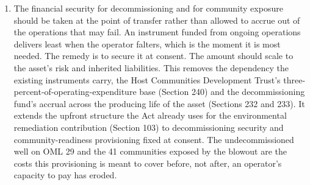 \documentclass[twoside,fontset=lmodern]{mitthesis}
\begin{document}
\begin{enumerate}
  operating personnel, rather than by discretion alone. A capability
  shortfall invisible at consent becomes visible only in operation, and
  an unmonitored latent exposure is the most dangerous kind. Nigeria's
  regulator already holds the powers this requires: to monitor and
  enforce compliance with the terms of leases and licenses (Section
  7(d)), and to carry out audits and investigations of licensees
  (Section 7(g)), with administrative penalties available for
  contravention (Section 231). Binding those powers to defined triggers
  connects an integrity finding to a graduated, pre-defined consequence
  rather than to discretion, subject to the operator's opportunity to
  respond. The powers already exist; the triggers are what is missing.
  The well left suspended and undecommissioned on OML 29 from 2015,
  unmonitored until it failed in 2021 (Section 4.3), is the exposure
  continuing verification is built to catch.
\item
  The financial security for decommissioning and for community exposure
  should be taken at the point of transfer rather than allowed to accrue
  out of the operations that may fail. An instrument funded from ongoing
  operations delivers least when the operator falters, which is the
  moment it is most needed. The remedy is to secure it at consent. The
  amount should scale to the asset's risk and inherited liabilities.
  This removes the dependency the existing instruments carry, the Host
  Communities Development Trust's three-percent-of-operating-expenditure
  base (Section 240) and the decommissioning fund's accrual across the
  producing life of the asset (Sections 232 and 233). It extends the
  upfront structure the Act already uses for the environmental
  remediation contribution (Section 103) to decommissioning security and
  community-readiness provisioning fixed at consent. The
  undecommissioned well on OML 29 and the 41 communities exposed by the
  blowout are the costs this provisioning is meant to cover before, not
  after, an operator's capacity to pay has eroded.
\end{enumerate}
\end{document}

